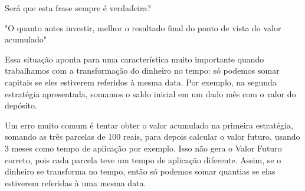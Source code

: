 \begin{reflection}
Será que esta frase sempre é verdadeira?

"O quanto antes investir, melhor o resultado final do ponto de vista do valor acumulado"
\end{reflection}


Essa situação aponta para uma característica muito importante quando trabalhamos com a transformação do dinheiro no tempo: só podemos somar capitais se eles estiverem referidos à mesma data. Por exemplo, na segunda estratégia apresentada, somamos o saldo inicial em um dado mês com o valor do depósito.

Um erro muito comum é tentar obter o valor acumulado na primeira estratégia, somando as três parcelas de 100 reais, para depois calcular o valor futuro, usando 3 meses como tempo de aplicação por exemplo. Isso não gera o Valor Futuro correto, pois cada parcela teve um tempo de aplicação diferente. Assim, se o dinheiro se transforma no tempo, então só podemos somar quantias se elas estiverem referidas à uma mesma data.

